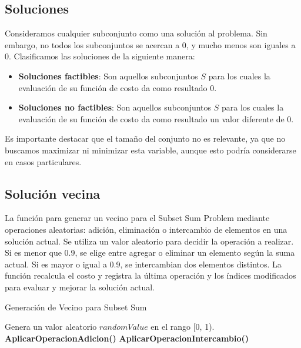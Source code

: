 \documentclass[spanish,12pt,letterpaper]{article}
\begin{document}
	\subsection{Soluciones}
	
	Consideramos cualquier subconjunto como una solución al problema. Sin embargo, no todos los subconjuntos se acercan a $0$, y mucho menos son iguales a $0$. Clasificamos las soluciones de la siguiente manera:
	
	\begin{itemize}
		\item \textbf{Soluciones factibles}: Son aquellos subconjuntos $S$ para los cuales la evaluación de su función de costo da como resultado $0$.
		\item \textbf{Soluciones no factibles}: Son aquellos subconjuntos $S$ para los cuales la evaluación de su función de costo da como resultado un valor diferente de $0$.
	\end{itemize}
	
	Es importante destacar que el tamaño del conjunto no es relevante, ya que no buscamos maximizar ni minimizar esta variable, aunque esto podría considerarse en casos particulares.
	\subsection{Solución vecina}
	La función para generar un vecino para el Subset Sum Problem mediante operaciones aleatorias: adición, eliminación o intercambio de elementos en una solución actual. Se utiliza un valor aleatorio para decidir la operación a realizar. Si es menor que 0.9, se elige entre agregar o eliminar un elemento según la suma actual. Si es mayor o igual a 0.9, se intercambian dos elementos distintos. La función recalcula el costo y registra la última operación y los índices modificados para evaluar y mejorar la solución actual.
	\begin{algorithm}
		\caption{Generación de Vecino para Subset Sum}
		\begin{algorithmic}[1]
			\State Genera un valor aleatorio $randomValue$ en el rango [0, 1).
			\State \textbf{AplicarOperacionAdicion()} 
			\Else
			\State \textbf{AplicarOperacionIntercambio()} 
			\EndIf
			\EndProcedure
		\end{algorithmic}
	\end{algorithm}
	
\end{document}
